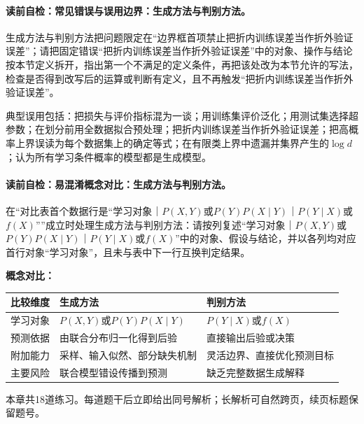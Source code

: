 \label{struct:V1-C10-CH30}
\paragraph{读前自检：常见错误与误用边界：生成方法与判别方法。}生成方法与判别方法把问题限定在“边界框首项禁止把折内训练误差当作折外验证误差”；请把固定错误“把折内训练误差当作折外验证误差”中的对象、操作与结论按本节定义拆开，指出第一个不满足的定义条件，再把该处改为本节允许的写法，检查是否得到改写后的运算或判断有定义，且不再触发“把折内训练误差当作折外验证误差”。\par

\begin{warningbox}
典型误用包括：把损失与评价指标混为一谈；用训练集评价泛化；用测试集选择超参数；在划分前用全数据拟合预处理；把折内训练误差当作折外验证误差；把高概率上界误读为每个数据集上的确定等式；在有限类上界中遗漏并集界产生的$\log d$；认为所有学习条件概率的模型都是生成模型。
\end{warningbox}

\label{struct:V1-C10-CH31}
\paragraph{读前自检：易混淆概念对比：生成方法与判别方法。}在“对比表首个数据行是“学习对象｜$P(X,Y)$或$P(Y)P(X\mid Y)$｜$P(Y\mid X)$或$f(X)$””成立时处理生成方法与判别方法：请按列复述“学习对象｜$P(X,Y)$或$P(Y)P(X\mid Y)$｜$P(Y\mid X)$或$f(X)$”中的对象、假设与结论，并以各列均对应首行对象“学习对象”，且未与表中下一行互换判定结果。\par

\begin{comparisonbox}
\textbf{概念对比：}\par\smallskip
\begin{tabularx}{\linewidth}{@{}l X X@{}}
\toprule 比较维度 & 生成方法 & 判别方法\\ \midrule
学习对象 & $P(X,Y)$或$P(Y)P(X\mid Y)$ & $P(Y\mid X)$或$f(X)$\\
预测依据 & 由联合分布归一化得到后验 & 直接输出后验或决策\\
附加能力 & 采样、输入似然、部分缺失机制 & 灵活边界、直接优化预测目标\\
主要风险 & 联合模型错设传播到预测 & 缺乏完整数据生成解释\\
\bottomrule
\end{tabularx}
\end{comparisonbox}
\begin{chapterexercisebox}
\label{struct:V1-C10-CH34}
\label{struct:V1-C10-CH35}
本章共18道练习。每道题干后立即给出同号解析；长解析可自然跨页，续页标题保留题号。
\end{chapterexercisebox}

